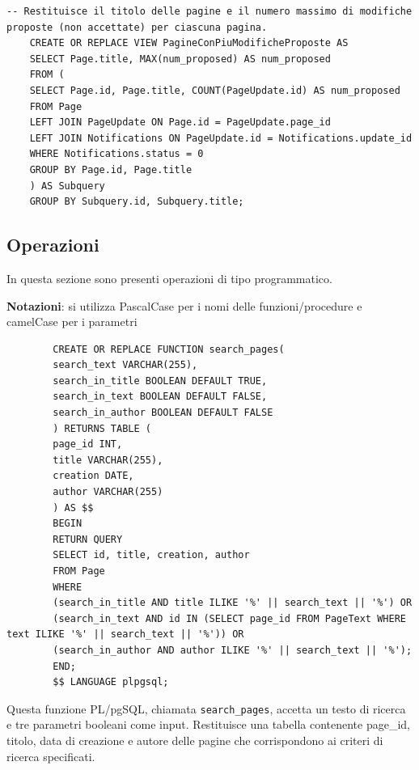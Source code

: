 \documentclass{article}
\begin{document}
\begin{lstlisting}[caption={Vista PagineConPiuModificheProposte}, label={lst:pagine_con_piu_modifiche_proposte}]
	-- Restituisce il titolo delle pagine e il numero massimo di modifiche proposte (non accettate) per ciascuna pagina.
	CREATE OR REPLACE VIEW PagineConPiuModificheProposte AS
	SELECT Page.title, MAX(num_proposed) AS num_proposed
	FROM (
	SELECT Page.id, Page.title, COUNT(PageUpdate.id) AS num_proposed
	FROM Page
	LEFT JOIN PageUpdate ON Page.id = PageUpdate.page_id
	LEFT JOIN Notifications ON PageUpdate.id = Notifications.update_id
	WHERE Notifications.status = 0
	GROUP BY Page.id, Page.title
	) AS Subquery
	GROUP BY Subquery.id, Subquery.title;
\end{lstlisting}

	\newpage

	\subsection{Operazioni}
	In questa sezione sono presenti operazioni di tipo programmatico.
	
	\textbf{Notazioni}: si utilizza PascalCase per i nomi delle funzioni/procedure e
	camelCase per i parametri
	
	\begin{lstlisting}
		CREATE OR REPLACE FUNCTION search_pages(
		search_text VARCHAR(255),
		search_in_title BOOLEAN DEFAULT TRUE,
		search_in_text BOOLEAN DEFAULT FALSE,
		search_in_author BOOLEAN DEFAULT FALSE
		) RETURNS TABLE (
		page_id INT,
		title VARCHAR(255),
		creation DATE,
		author VARCHAR(255)
		) AS $$
		BEGIN
		RETURN QUERY
		SELECT id, title, creation, author
		FROM Page
		WHERE
		(search_in_title AND title ILIKE '%' || search_text || '%') OR
		(search_in_text AND id IN (SELECT page_id FROM PageText WHERE text ILIKE '%' || search_text || '%')) OR
		(search_in_author AND author ILIKE '%' || search_text || '%');
		END;
		$$ LANGUAGE plpgsql;
	\end{lstlisting}
	
	
	
	Questa funzione PL/pgSQL, chiamata \texttt{search\_pages}, accetta un testo di ricerca e tre parametri booleani come input. Restituisce una tabella contenente page\_id, titolo, data di creazione e autore delle pagine che corrispondono ai criteri di ricerca specificati. \\\\
	
\end{document}
